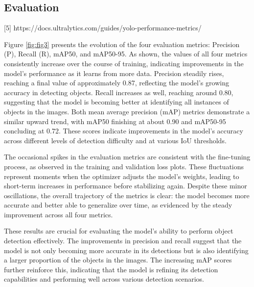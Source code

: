 \documentclass[conference]{IEEEtran}
\begin{document}
\subsection{Evaluation}

[5] https://docs.ultralytics.com/guides/yolo-performance-metrics/

Figure \ref{fig:fig3} presents the evolution of the four evaluation metrics: 
Precision (P), 
Recall (R), 
mAP50, 
and mAP50-95. 
As shown, 
the values of all four metrics consistently increase over the course of training, 
indicating improvements in the model’s performance as it learns from more data. 
Precision steadily rises, 
reaching a final value of approximately 0.87, 
reflecting the model's growing accuracy in detecting objects. 
Recall increases as well, 
reaching around 0.80, 
suggesting that the model is becoming better at identifying all instances of objects in the images. 
Both mean average precision (mAP)
metrics demonstrate a similar upward trend, 
with mAP50 finishing at about 0.90 and mAP50-95 concluding at 0.72. 
These scores indicate improvements in the model's accuracy across different levels of detection difficulty and at various IoU thresholds.

The occasional spikes in the evaluation metrics are consistent with the fine-tuning process, 
as observed in the training and validation loss plots. 
These fluctuations represent moments when the optimizer adjusts the model’s weights, 
leading to short-term increases in performance before stabilizing again. 
Despite these minor oscillations, 
the overall trajectory of the metrics is clear: 
the model becomes more accurate and better able to generalize over time, 
as evidenced by the steady improvement across all four metrics.

These results are crucial for evaluating the model’s ability to perform object detection effectively. 
The improvements in precision and recall suggest that the model is not only becoming more accurate in its detections but is also identifying a larger proportion of the objects in the images. 
The increasing mAP scores further reinforce this, 
indicating that the model is refining its detection capabilities and performing well across various detection scenarios.
\end{document}
